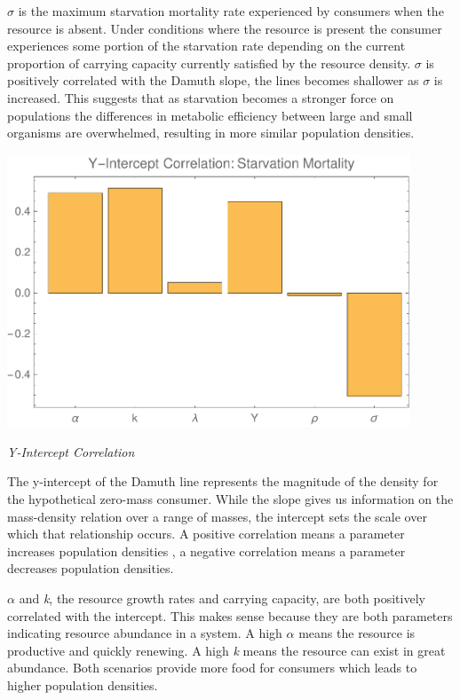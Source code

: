 \documentclass[]{rsos}%
\begin{document}
$\sigma$ is the maximum starvation mortality rate experienced by consumers when the resource is absent.  Under conditions where the resource is present the consumer experiences some portion of the starvation rate depending on the current proportion of carrying capacity currently satisfied by the resource density. $\sigma$ is positively correlated with the Damuth slope, the lines becomes shallower as $\sigma$ is increased. This suggests that as starvation becomes a stronger force on populations the differences in metabolic efficiency between large and small organisms are overwhelmed, resulting in more similar population densities. \\

\vspace{0.5cm}

\includegraphics[width=0.9\textwidth]{int_corr_starve.pdf}

\vspace{0.5cm}

\emph{Y-Intercept Correlation}

The y-intercept of the Damuth line represents the magnitude of the density for the hypothetical zero-mass consumer. While the slope gives us information on the mass-density relation over a range of masses, the intercept sets the scale over which that relationship occurs. A positive correlation means a parameter increases population densities , a negative correlation means a parameter decreases population densities. 

$\alpha$ and \emph{k}, the resource growth rates and carrying capacity, are both positively correlated with the intercept. This makes sense because they are both parameters indicating resource abundance in a system. A high $\alpha$ means the resource is productive and quickly renewing. A high \emph{k} means the resource can exist in great abundance. Both scenarios provide more food for consumers which leads to higher population densities.
\end{document}
